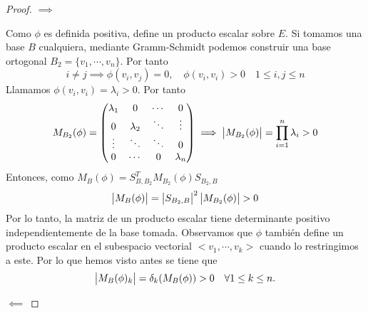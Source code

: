 \begin{proof}
	$\implies$
	
	Como $\phi$ es definida positiva, define un producto escalar
	sobre $E$. Si tomamos una base $B$ cualquiera, mediante
	Gramm-Schmidt podemos construir una base ortogonal
	$B_2 = \{v_1, \cdots, v_n \}$. Por tanto
	\[
		i \neq j \implies \phi(v_i, v_j) = 0, \quad \phi(v_i,v_i) 
		> 0 \quad 1 \leq i, j \leq n
	\]
	Llamamos $\phi(v_i, v_i) = \lambda_i > 0$. Por tanto
	\[
		M_{B_2}(\phi) = \begin{pmatrix}
		\lambda_1 & 0 & \cdots & 0 \\
		0 & \lambda_2 & \ddots & \vdots \\
		\vdots & \ddots & \ddots & 0 \\
		0 & \cdots & 0 & \lambda_n
		\end{pmatrix} \implies \begin{vmatrix}M_{B_2}(\phi)\end{vmatrix} =
		\prod_{i=1}^{n} \lambda_i > 0
	\]
	Entonces, como $M_B(\phi) = S_{B,B_2}^TM_{B_2}(\phi)S_{B_2,B}$
	\[
		\begin{vmatrix}M_B(\phi)\end{vmatrix} = \begin{vmatrix}S_{B_2,B}\end{vmatrix}^2
		\begin{vmatrix}M_{B_2}(\phi)\end{vmatrix} > 0
	\]
	Por lo tanto, la matriz de un producto escalar tiene
	determinante positivo independientemente de la base tomada.
	Observamos que $\phi$ también define un producto escalar en
	el subespacio vectorial $<v_1,\cdots,v_k>$ cuando lo
	restringimos a este. Por lo que hemos visto antes se tiene que
	\[
	\begin{vmatrix}M_B(\phi)_k\end{vmatrix} = \delta_k(M_B(\phi)) > 0
	\quad \forall 1 \leq k \leq n.
	\]
	
	\noindent $\impliedby$
	

\end{proof}
